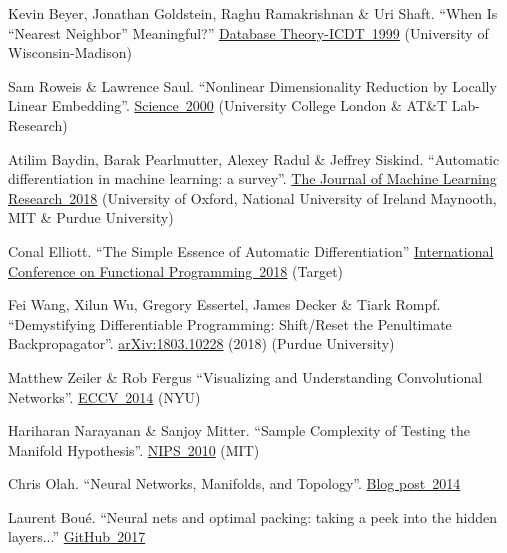 \documentclass{article}
\begin{document}
\begin{thebibliography}{10}
 Kevin Beyer, Jonathan Goldstein, Raghu Ramakrishnan \& Uri Shaft. ``When Is ``Nearest Neighbor'' Meaningful?'' \href{https://www.researchgate.net/profile/Jonathan_Goldstein4/publication/2845566_When_Is_Nearest_Neighbor_Meaningful/links/09e4150b3eb298bf21000000/When-Is-Nearest-Neighbor-Meaningful.pdf}{Database Theory-ICDT~1999} (University of Wisconsin-Madison)

 Sam Roweis \& Lawrence Saul. ``Nonlinear Dimensionality Reduction by Locally Linear Embedding''. \href{http://www.robots.ox.ac.uk/~az/lectures/ml/lle.pdf}{Science~2000} (University College London \& AT\&T Lab-Research)

 Atilim Baydin, Barak Pearlmutter, Alexey Radul \& Jeffrey Siskind. ``Automatic differentiation in machine learning: a survey''. \href{http://www.jmlr.org/papers/volume18/17-468/17-468.pdf}{The Journal of Machine Learning Research~2018} (University of Oxford, National University of Ireland Maynooth, MIT \& Purdue University)

 Conal Elliott. ``The Simple Essence of Automatic Differentiation'' \href{http://conal.net/papers/essence-of-ad/essence-of-ad-icfp.pdf}{International Conference on Functional Programming~2018} (Target)

 Fei Wang, Xilun Wu, Gregory Essertel, James Decker \& Tiark Rompf. ``Demystifying Differentiable Programming: Shift/Reset the Penultimate Backpropagator''. \href{https://arxiv.org/pdf/1803.10228.pdf}{arXiv:1803.10228} (2018) (Purdue University)

 Matthew Zeiler \& Rob Fergus ``Visualizing and Understanding Convolutional Networks''. \href{https://cs.nyu.edu/~fergus/papers/zeilerECCV2014.pdf}{ECCV~2014} (NYU)

 Hariharan Narayanan \& Sanjoy Mitter. ``Sample Complexity of Testing the Manifold Hypothesis''. \href{https://papers.nips.cc/paper/3958-sample-complexity-of-testing-the-manifold-hypothesis.pdf}{NIPS~2010} (MIT)

 Chris Olah. ``Neural Networks, Manifolds, and Topology''. \href{http://colah.github.io/posts/2014-03-NN-Manifolds-Topology/}{Blog post~2014}

 Laurent Bou\'e. ``Neural nets and optimal packing: taking a peek into the hidden layers...'' \href{https://github.com/Ranlot/spiralNet}{GitHub~2017}


\end{thebibliography}
\end{document}
